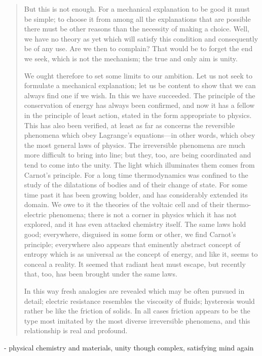 \documentclass{article}
\begin{document}
\begin{quote}
     But this is not enough.  For a mechanical explanation to be good it must be simple; to choose it from among all the explanations that are possible there must be other reasons than the necessity of making a choice.  Well, we have no theory as yet which will satisfy this condition and consequently be of any use.  Are we then to complain?  That would be to forget the end we seek, which is not the mechanism; the true and only aim is unity.  
     
     We ought therefore to set some limits to our ambition.  Let us not seek to formulate a mechanical explanation; let us be content to show that we can always find one if we wish.  In this we have succeeded.  The principle of the conservation of energy has always been confirmed, and now it has a fellow in the principle of least action, stated in the form appropriate to physics.  This has also been verified, at least as far as concerns the reversible phenomena which obey Lagrange's equations---in other words, which obey the most general laws of physics.  The irreversible phenomena are much more difficult to bring into line; but they, too, are being coordinated and tend to come into the unity.  The light which illuminates them comes from Carnot's principle.  For a long time thermodynamics was confined to the study of the dilatations of bodies and of their change of state.  For some time past it has been growing bolder, and has considerably extended its domain.  We owe to it the theories of the voltaic cell and of their thermo-electric phenomena; there is not a corner in physics which it has not explored, and it has even attacked chemistry itself.  The same laws hold good; everywhere, disguised in some form or other, we find Carnot's principle; everywhere also appears that eminently abstract concept of entropy which is as universal as the concept of energy, and like it, seems to conceal a reality.  It seemed that radiant heat must escape, but recently that, too, has been brought under the same laws.  
     
     In this way fresh analogies are revealed which may be often pursued in detail; electric resistance resembles the viscosity of fluids; hysteresis would rather be like the friction of solids.  In all cases friction appears to be the type most imitated by the most diverse irreversible phenomena, and this relationship is real and profound.  
     \citep[p. 175 - 178]{Poincare1952}
 \end{quote}
 
 - physical chemistry and materials, unity though complex, satisfying mind again
 
\end{document}
